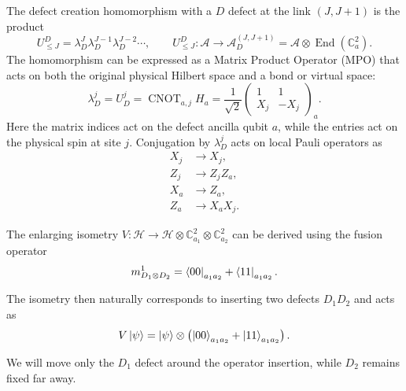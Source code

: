 \documentclass{article}
\newcommand{\mA}{\mathcal{A}}
\theoremstyle{definition}
\begin{document}
The defect creation homomorphism with a \(D\) defect at the link
\((J,J+1)\) is the product
\[
    U_{\leq J}^{D}
    =
    \lambda_D^J\lambda_D^{J-1}\lambda_D^{J-2}\cdots ,
    \qquad
    U_{\leq J}^D:\mA\to
    \mA^{(J,J+1)}_D
    =
    \mA\otimes \operatorname{End}(\mathbb C^2_a).
\]
The homomorphism can be expressed as a Matrix Product Operator (MPO) that acts on both the original physical Hilbert space and a bond or virtual space:
\begin{equation}
    \lambda_D^j
    =
    U_D^j
    =
    \operatorname{CNOT}_{a,j}H_a
    =
    \frac{1}{\sqrt2}
    \begin{pmatrix}
        1 & 1\\
        X_j & -X_j
    \end{pmatrix}_{a}.
\end{equation}
Here the matrix indices act on the defect ancilla qubit \(a\), while the entries
act on the physical spin at site \(j\).  Conjugation by \(\lambda_D^j\)
acts on local Pauli operators as
\begin{equation}
\label{eq:repd8movementaction}
\begin{aligned}
    X_j &\to X_j,\\
    Z_j &\to Z_j Z_a,\\
    X_a &\to Z_a,\\
    Z_a &\to X_a X_j .
\end{aligned}
\end{equation}


The enlarging isometry $V: \mathcal H\longrightarrow
    \mathcal H\otimes \mathbb C^2_{a_1}\otimes \mathbb C^2_{a_2}$ can be derived using the fusion operator
\begin{equation}
    m^1_{D_1\otimes D_2}
    =
    \bra{00}_{a_1a_2}+\bra{11}_{a_1a_2}.
\end{equation}

The isometry then naturally corresponds to inserting two defects $D_1D_2$ and acts as
\begin{equation}
     V\ket{\psi}
    =
    \ket{\psi}\otimes  \left(\ket{00}_{a_1a_2}+\ket{11}_{a_1a_2}\right).
\end{equation}
 
 We will move only the
\(D_1\) defect around the operator insertion, while \(D_2\) remains
fixed far away.
\end{document}
